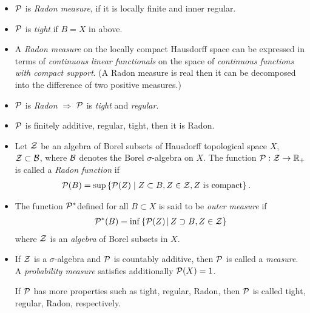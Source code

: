 \documentclass[11pt]{article}
\begin{document}
\begin{itemize}
\item ${\mathcal P}$ is \emph{Radon measure}, if it is locally finite and inner regular. 


\item ${\mathcal P}$ is \emph{tight} if $B= X$ in above.

\item A \emph{Radon measure} on the  locally compact Hausdorff space can be expressed in terms of \emph{continuous linear functionals} on the space of \emph{continuous functions with compact support}. (A Radon measure is real then it can be decomposed into the difference of two positive measures.)


\item ${\mathcal P}$ is \emph{Radon} $\Rightarrow$  ${\mathcal P}$ is \emph{tight} and \emph{regular}. 

\item ${\mathcal P}$ is finitely additive, regular, tight, then it is Radon. 

\item Let ${\mathcal Z}$ be an algebra of Borel subsets of Hausdorff topological space $X$, ${\mathcal Z}\subset {\mathcal B}$, where ${\mathcal B}$ denotes the Borel $\sigma$-algebra on $X$.  The function ${\mathcal P}: {\mathcal Z} \rightarrow {\mathbb R}_{+}$ is called a \emph{Radon function} if 
\begin{align*}
{\mathcal P}(B) &=\sup\left\{ {\mathcal P}(Z) \;|\; Z\subset B, Z\in {\mathcal Z}, Z\text{ is compact} \right\}.
\end{align*}



\item \begin{definition}
The function ${\mathcal P}^{*}$defined for all $B\subset X$ is said to be \emph{outer measure} if 
\begin{align*}
{\mathcal P}^{*}(B) = \inf\left\{ {\mathcal P}(Z)\,|\, Z\supset B, Z\in {\mathcal Z} \right\}
\end{align*}
where ${\mathcal Z}$ is an \emph{algebra} of Borel subsets in $X$.
\end{definition}

\item If  ${\mathcal Z}$ is a $\sigma$-algebra and ${\mathcal P}$ is countably additive, then ${\mathcal P}$ is called a \emph{measure}. A \emph{probability measure} satisfies additionally ${\mathcal P}(X) = 1$.

If ${\mathcal P}$ has more properties such as tight, regular, Radon, then ${\mathcal P}$ is called tight, regular, Radon, respectively.


\end{itemize}
\end{document}
